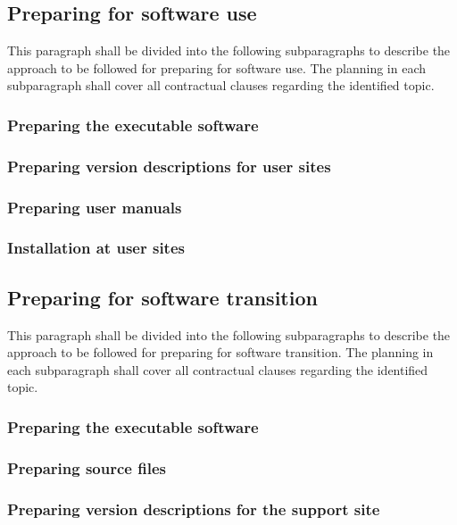\documentclass{fidata-report-template}
\begin{document}
\subsection{Preparing for software use}

This paragraph shall be divided into the following subparagraphs to
describe the approach to be followed for preparing for software use. The
planning in each subparagraph shall cover all contractual clauses
regarding the identified topic.

\subsubsection{Preparing the executable software}

\subsubsection{Preparing version descriptions for user sites}

\subsubsection{Preparing user manuals}

\subsubsection{Installation at user sites}

\subsection{Preparing for software transition}

This paragraph shall be divided into the following subparagraphs to
describe the approach to be followed for preparing for software
transition. The planning in each subparagraph shall cover all
contractual clauses regarding the identified topic.

\subsubsection{Preparing the executable software}

\subsubsection{Preparing source files}

\subsubsection{Preparing version descriptions for the support site}
\end{document}
